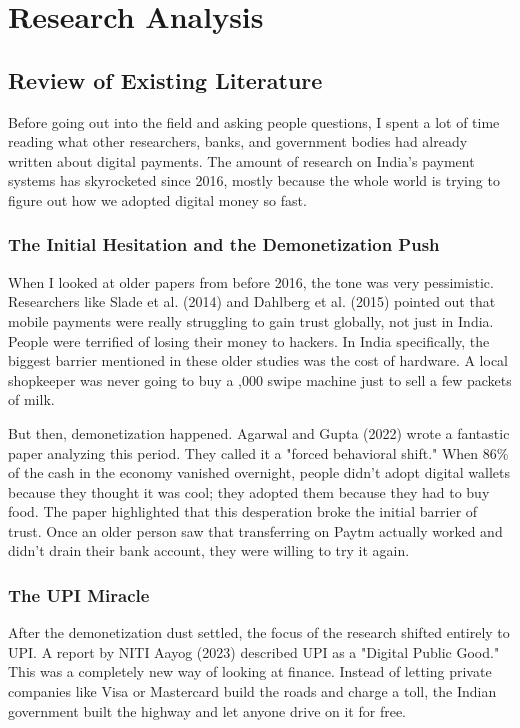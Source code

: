 \chapter{Research Analysis}

\section{Review of Existing Literature}

Before going out into the field and asking people questions, I spent a lot of time reading what other researchers, banks, and government bodies had already written about digital payments. The amount of research on India's payment systems has skyrocketed since 2016, mostly because the whole world is trying to figure out how we adopted digital money so fast.

\subsection{The Initial Hesitation and the Demonetization Push}
When I looked at older papers from before 2016, the tone was very pessimistic. Researchers like Slade et al. (2014) and Dahlberg et al. (2015) pointed out that mobile payments were really struggling to gain trust globally, not just in India. People were terrified of losing their money to hackers. In India specifically, the biggest barrier mentioned in these older studies was the cost of hardware. A local shopkeeper was never going to buy a ,000 swipe machine just to sell a few packets of milk.

But then, demonetization happened. Agarwal and Gupta (2022) wrote a fantastic paper analyzing this period. They called it a "forced behavioral shift." When 86\% of the cash in the economy vanished overnight, people didn't adopt digital wallets because they thought it was cool; they adopted them because they had to buy food. The paper highlighted that this desperation broke the initial barrier of trust. Once an older person saw that transferring  on Paytm actually worked and didn't drain their bank account, they were willing to try it again.

\subsection{The UPI Miracle}
After the demonetization dust settled, the focus of the research shifted entirely to UPI. A report by NITI Aayog (2023) described UPI as a "Digital Public Good." This was a completely new way of looking at finance. Instead of letting private companies like Visa or Mastercard build the roads and charge a toll, the Indian government built the highway and let anyone drive on it for free.

